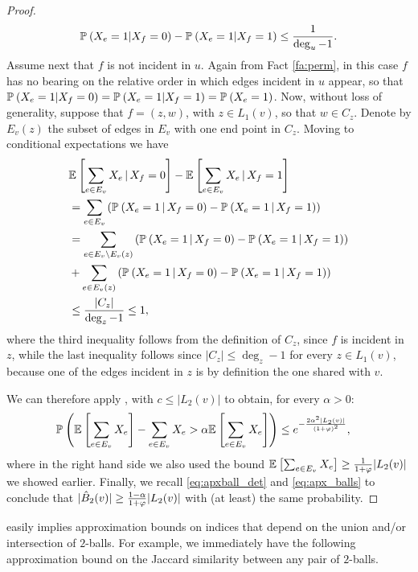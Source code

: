 \begin{proof}
\[
    \mathbb{P}_{} \left( X_e = 1\vert X_f = 0 \right) - \mathbb{P}_{} \left( X_e = 1\vert X_f = 1 \right)\le\frac{1}{\deg_u - 1}.
\]
Assume next that $f$ is not incident in $u$. Again from Fact \ref{fa:perm}, in this case $f$ has no bearing on the relative order in which edges incident in $u$ appear, so that $\mathbb{P}_{} \left( X_e = 1\vert X_f = 0 \right) = \mathbb{P}_{} \left( X_e = 1\vert X_f = 1 \right) = \mathbb{P}_{} \left( X_e = 1 \right)$. Now, without loss of generality, suppose that $f = (z, w)$, with $z\in L_1(v)$, so that $w\in C_{z}$. Denote by $E_v(z)$ the subset of edges in $E_v$ with one end point in $C_{z}$. Moving to conditional expectations we have
\begin{align*}
    &\mathbb{E}_{} \left[ \sum_{e\in E_v}X_e \, \vert\,  X_f = 0 \right] - \mathbb{E}_{} \left[ \sum_{e\in E_v}X_e \, \vert\, X_f = 1 \right] \\
    &= \sum_{e\in E_v}\left(\mathbb{P}_{} \left( X_e = 1 \, \vert\, X_f = 0 \right) - \mathbb{P}_{} \left( X_e = 1 \, \vert\, X_f = 1 \right)\right)\\
    &= \sum_{e\in E_v \setminus E_v(z)}\left(\mathbb{P}_{} \left( X_e = 1 \, \vert\, X_f = 0 \right) - \mathbb{P}_{} \left( X_e = 1 \, \vert\, X_f = 1 \right)\right) \\
    &+ \sum_{e\in E_v(z)}\left(\mathbb{P}_{} \left( X_e = 1 \, \vert\, X_f = 0 \right) - \mathbb{P}_{} \left( X_e = 1 \, \vert \, X_f = 1 \right)\right)\\
    &\le\frac{|C_{z}|}{\deg_z - 1}\le 1,
\end{align*}
where the third inequality follows from the definition of $C_z$, since $f$ is incident in $z$, while the last inequality follows since $|C_z|\le \deg_z - 1$ for every $z\in L_1(v)$, because one of the edges incident in $z$ is by definition the one shared with $v$.

We can therefore apply \cite[Definition 5.5 and Corollary 5.1]{dubhashi2009concentration}, with $c\le |L_2(v)|$ to obtain, for every $\alpha > 0$:
\begin{align*}
    &\mathbb{P}_{} \left( \mathbb{E}_{} \left[ \sum_{e\in E_v}X_e \right] - \sum_{e\in E_v}X_e > \alpha\mathbb{E}_{} \left[ \sum_{e\in E_v}X_e \right] \right)\le e^{-\frac{2\alpha^2|L_2(v)|}{(1 + \varphi)^2}},
\end{align*}
where in the right hand side we also used the bound $\mathbb{E}_{} \left[ \sum_{e\in E_v}X_e \right]\ge\frac{1}{1 + \varphi}|L_2(v)|$ we showed earlier.
Finally, we recall \eqref{eq:apxball_det} and \eqref{eq:apx_balls} to conclude that $|\hat{B}_2(v)|\ge \frac{1 - \alpha}{1 + \varphi}|L_2(v)|$ with (at least) the same probability.
\end{proof}

 easily implies approximation bounds on indices that depend on the union and/or intersection of $2$-balls. For example, we immediately have the following approximation bound on the Jaccard similarity between any pair of $2$-balls.

